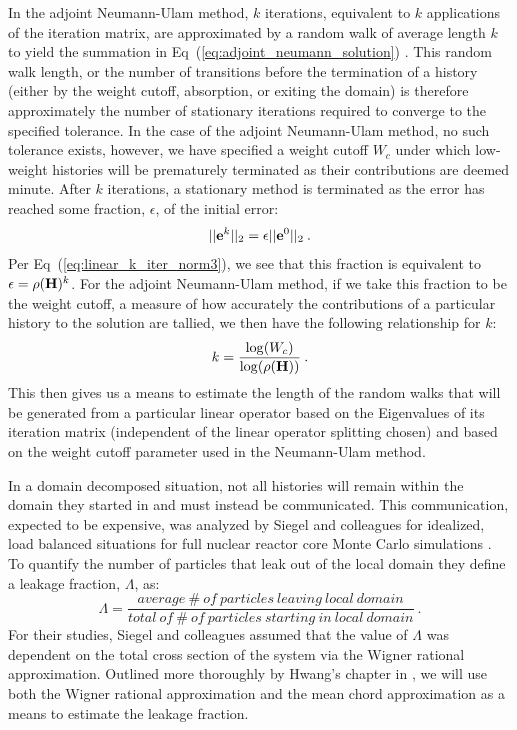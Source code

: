 \documentclass{mc2013}
\begin{document}
In the adjoint Neumann-Ulam method, $k$ iterations, equivalent to $k$
applications of the iteration matrix, are approximated by a random
walk of average length $k$ to yield the summation in
Eq~(\ref{eq:adjoint_neumann_solution})
\cite{dimov_new_1998,halton_sequential_1994,danilov_asymptotic_2000}. This
random walk length, or the number of transitions before the
termination of a history (either by the weight cutoff, absorption, or
exiting the domain) is therefore approximately the number of
stationary iterations required to converge to the specified
tolerance. In the case of the adjoint Neumann-Ulam method, no such
tolerance exists, however, we have specified a weight cutoff $W_c$
under which low-weight histories will be prematurely terminated as
their contributions are deemed minute. After $k$ iterations, a
stationary method is terminated as the error has reached some
fraction, $\epsilon$, of the initial error:
\begin{equation}
  ||\mathbf{e}^{k}||_2 = \epsilon ||\mathbf{e}^0||_2\:.
  \label{eq:linear_k_iter_norm4}
\end{equation}
Per Eq~(\ref{eq:linear_k_iter_norm3}), we see that this fraction is
equivalent to $\epsilon = \rho(\mathbf{H})^k$. For the adjoint
Neumann-Ulam method, if we take this fraction to be the weight cutoff,
a measure of how accurately the contributions of a particular history
to the solution are tallied, we then have the following relationship
for $k$:
\begin{equation}
  k = \frac{ \log(W_c) }{ \log( \rho(\mathbf{H}) ) }\:.
  \label{eq:analytic_k}
\end{equation}
This then gives us a means to estimate the length of the random walks
that will be generated from a particular linear operator based on the
Eigenvalues of its iteration matrix (independent of the linear
operator splitting chosen) and based on the weight cutoff parameter
used in the Neumann-Ulam method.

\label{subsec:domain_leak_approx}

In a domain decomposed situation, not all histories will remain within
the domain they started in and must instead be communicated. This
communication, expected to be expensive, was analyzed by Siegel and
colleagues for idealized, load balanced situations for full nuclear
reactor core Monte Carlo simulations \cite{siegel_analysis_2012}.  To
quantify the number of particles that leak out of the local domain
they define a leakage fraction, $\Lambda$, as:
\begin{equation}
  \Lambda = \frac{average\ \#\ of\ particles\ leaving\ local\ domain}
          {total\ of\ \#\ of\ particles\ starting\ in\ local\ domain}\:.
          \label{eq:leakage_fraction}
\end{equation}
For their studies, Siegel and colleagues assumed that the value of
$\Lambda$ was dependent on the total cross section of the system via
the Wigner rational approximation. Outlined more thoroughly by Hwang's
chapter in \cite{azmy_nuclear_2010}, we will use both the Wigner
rational approximation and the mean chord approximation as a means to
estimate the leakage fraction.
\end{document}
